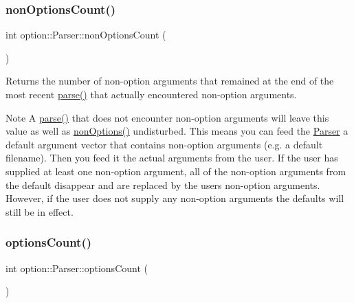 \subsubsection{\texorpdfstring{non\+Options\+Count()}{nonOptionsCount()}}
{\footnotesize\ttfamily int option\+::\+Parser\+::non\+Options\+Count (\begin{DoxyParamCaption}{ }\end{DoxyParamCaption})\hspace{0.3cm}{\ttfamily [inline]}}



Returns the number of non-\/option arguments that remained at the end of the most recent \hyperlink{classoption_1_1Parser_a6e0b5778d1cfbd6cd51240e74d01e138}{parse()} that actually encountered non-\/option arguments. 

\begin{DoxyNote}{Note}
A \hyperlink{classoption_1_1Parser_a6e0b5778d1cfbd6cd51240e74d01e138}{parse()} that does not encounter non-\/option arguments will leave this value as well as \hyperlink{classoption_1_1Parser_a2c11b050f4248d71758dda52c5f9154d}{non\+Options()} undisturbed. This means you can feed the \hyperlink{classoption_1_1Parser}{Parser} a default argument vector that contains non-\/option arguments (e.\+g. a default filename). Then you feed it the actual arguments from the user. If the user has supplied at least one non-\/option argument, all of the non-\/option arguments from the default disappear and are replaced by the user\textquotesingle{}s non-\/option arguments. However, if the user does not supply any non-\/option arguments the defaults will still be in effect. 
\end{DoxyNote}
\mbox{\label{classoption_1_1Parser_aee62badd2a19a5b88cbc4a9b11813b82}} 
\subsubsection{\texorpdfstring{options\+Count()}{optionsCount()}}
{\footnotesize\ttfamily int option\+::\+Parser\+::options\+Count (\begin{DoxyParamCaption}{ }\end{DoxyParamCaption})\hspace{0.3cm}{\ttfamily [inline]}}




